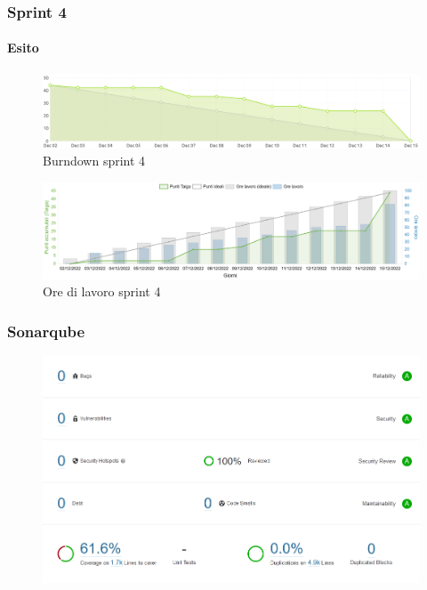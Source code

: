 \documentclass{beamer}
\begin{document}
\begin{frame}
  \frametitle{Sprint 4}
  \framesubtitle{Esito}

  \begin{figure}
    \centering
    \includegraphics[width=\textwidth]{../img/sprint4/burndown.png}
    \caption{Burndown sprint 4}
  \end{figure}
  \begin{figure}
    \centering
    \includegraphics[width=\textwidth]{../img/sprint4/worktime.png}
    \caption{Ore di lavoro sprint 4}
  \end{figure}
\end{frame}


\begin{frame}
  \frametitle{Sonarqube}
  \begin{figure}[H]
      \centering
      \includegraphics[scale=0.42]{../img/sprint4/sonarqube.png}
  \end{figure}
\end{frame}
\end{document}
